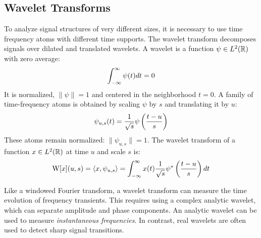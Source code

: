 {\subsection{Wavelet Transforms\protect\footnotemark}
}
\label{sec:atom-decomp}
To analyze signal structures of very different sizes, it is necessary
to use time frequency atoms with different time supports.  The wavelet
transform decomposes signals over dilated and translated wavelets.  A
wavelet is a function $\psi \in L^2(\mathbb{R})$ with zero average:
\[ \int_{-\infty}^{\infty} \psi(t)dt = 0\]
It is normalized, $\|\psi\|=1$ and centered in the neighborhood
$t=0$.  A family of time-frequency atoms is obtained by scaling $\psi$
by $s$ and translating it by $u$:
\[\psi_{u,s}(t) = \frac{1}{\sqrt{s}} \psi \left(\frac{t-u}{s}\right)\]
These atoms remain normalized: $\|\psi_{u,s}\|=1$.  The wavelet
transform of a function $x\in L^2(\mathbb{R})$ at time $u$ and scale $s$ is:
\begin{equation}
\label{eqn:wavelet}
\operatorname{W}[x](u,s) = \langle x,\psi_{u,s}\rangle
= \int_{-\infty}^{\infty} x(t)\frac{1}{\sqrt{s}} \psi^* \left(\frac{t-u}{s}\right) dt
\end{equation}

Like a windowed Fourier transform, a wavelet transform can measure the
time evolution of frequency transients.  This requires using a complex
analytic wavelet, which can separate amplitude and phase components.
An analytic wavelet can be used to measure \emph{instantaneous
frequencies}.  In contrast, real wavelets are often used to detect
sharp signal transitions.

